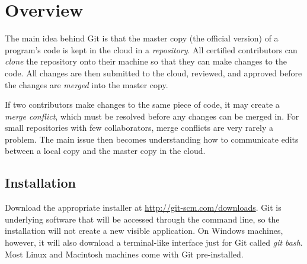 \label{appendix:git}


\section*{Overview} %

The main idea behind Git is that the master copy (the official version) of a program's code is kept in the cloud in a \emph{repository}.
All certified contributors can \emph{clone} the repository onto their machine so that they can make changes to the code.
All changes are then submitted to the cloud, reviewed, and approved before the changes are \emph{merged} into the master copy.

If two contributors make changes to the same piece of code, it may create a \emph{merge conflict}, which must be resolved before any changes can be merged in.
For small repositories with few collaborators, merge conflicts are very rarely a problem.
The main issue then becomes understanding how to communicate edits between a local copy and the master copy in the cloud.

\subsection*{Installation} %

Download the appropriate installer at \url{http://git-scm.com/downloads}.
Git is underlying software that will be accessed through the command line, so the installation will not create a new visible application.
On Windows machines, however, it will also download a terminal-like interface just for Git called \emph{git bash}.
Most Linux and Macintosh machines come with Git pre-installed.

